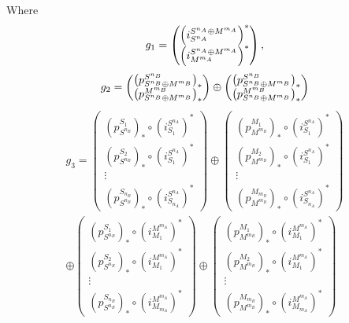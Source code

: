 \begin{remark}
    Where
    \[
        g_1 =
        \begin{pmatrix}
            \left(  i_{S^{n_A}}^{S^{n_A} \oplus M^{m_A}}  \right)^* \\
            \left(  i_{M^{m_A}}^{S^{n_A} \oplus M^{m_A}}  \right)^*
        \end{pmatrix},
    \]
    \[
        g_2 =
        \begin{pmatrix}
            \left(  p_{S^{n_B} \oplus M^{m_B}}^{S^{n_B}}  \right)_* \\
            \left(  p_{S^{n_B} \oplus M^{m_B}}^{M^{m_B}}  \right)_*
        \end{pmatrix}
        \oplus
        \begin{pmatrix}
            \left(  p_{S^{n_B} \oplus M^{m_B}}^{S^{n_B}}  \right)_* \\
            \left(  p_{S^{n_B} \oplus M^{m_B}}^{M^{m_B}}  \right)_*
        \end{pmatrix}
    \]
    \begin{multline*}
        g_3 =
        \begin{pmatrix}
            (p_{S^{n_B}}^{S_1})_* \circ (i_{S_1}^{S^{n_A}})^* \\
            (p_{S^{n_B}}^{S_2})_* \circ (i_{S_1}^{S^{n_A}})^* \\
            \vdots \\
            (p_{S^{n_B}}^{S_{n_B}})_* \circ (i_{S_{n_A}}^{S^{n_A}})^*
        \end{pmatrix}
        \oplus
        \begin{pmatrix}
            (p_{M^{m_B}}^{M_1})_* \circ (i_{S_1}^{S^{n_A}})^* \\
            (p_{M^{m_B}}^{M_2})_* \circ (i_{S_1}^{S^{n_A}})^* \\
            \vdots \\
            (p_{M^{m_B}}^{M_{m_B}})_* \circ (i_{S_{n_A}}^{S^{n_A}})^*
        \end{pmatrix} \\
        \oplus
        \begin{pmatrix}
            (p_{S^{n_B}}^{S_1})_* \circ (i_{M_1}^{M^{m_A}})^* \\
            (p_{S^{n_B}}^{S_2})_* \circ (i_{M_1}^{M^{m_A}})^* \\
            \vdots \\
            (p_{S^{n_B}}^{S_{n_B}})_* \circ (i_{M_{m_A}}^{M^{m_A}})^*
        \end{pmatrix}
        \oplus
        \begin{pmatrix}
            (p_{M^{m_B}}^{M_1})_* \circ (i_{M_1}^{M^{m_A}})^* \\
            (p_{M^{m_B}}^{M_2})_* \circ (i_{M_1}^{M^{m_A}})^* \\
            \vdots \\
            (p_{M^{m_B}}^{M_{m_B}})_* \circ (i_{M_{m_A}}^{M^{m_A}})^*
        \end{pmatrix}
    \end{multline*}


\end{remark}
